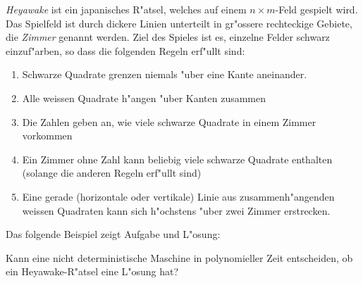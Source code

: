 {\em Heyawake} ist ein japanisches R"atsel, welches auf einem $n\times m$-Feld
gespielt wird. Das Spielfeld ist durch dickere Linien unterteilt in gr"ossere rechteckige Gebiete, die {\it Zimmer} genannt werden. 
Ziel des Spieles ist es, einzelne Felder schwarz einzuf"arben, so dass die
folgenden Regeln erf"ullt sind:
\begin{enumerate}
\item
Schwarze Quadrate grenzen niemals "uber eine Kante aneinander.
\item
Alle weissen Quadrate h"angen "uber Kanten zusammen
\item
Die Zahlen geben an, wie viele schwarze Quadrate in einem Zimmer vorkommen
\item
Ein Zimmer ohne Zahl kann beliebig viele schwarze Quadrate enthalten
(solange die anderen Regeln erf"ullt sind)
\item
Eine gerade (horizontale oder vertikale) Linie aus zusammenh"angenden
weissen Quadraten kann sich h"ochstens "uber zwei
Zimmer erstrecken.
\end{enumerate}
Das folgende Beispiel zeigt Aufgabe und L"osung:
\begin{center}
\qquad
{}
\end{center}

Kann eine nicht deterministische Maschine in polynomieller Zeit entscheiden,
ob ein Heyawake-R"atsel eine L"osung hat?

